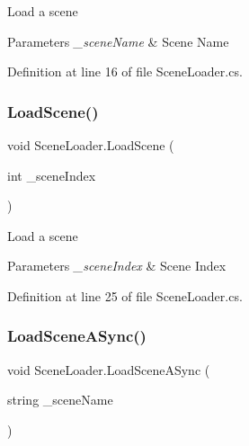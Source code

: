 Load a scene 


\begin{DoxyParams}{Parameters}
{\em \+\_\+scene\+Name} & Scene Name\\
\hline
\end{DoxyParams}


Definition at line 16 of file Scene\+Loader.\+cs.

\mbox{\label{class_scene_loader_a13020def59e988030b5a019fe31baaa3}} 
\subsubsection{\texorpdfstring{Load\+Scene()}{LoadScene()}\hspace{0.1cm}{\footnotesize\ttfamily [2/2]}}
{\footnotesize\ttfamily void Scene\+Loader.\+Load\+Scene (\begin{DoxyParamCaption}\item[{int}]{\+\_\+scene\+Index }\end{DoxyParamCaption})}



Load a scene 


\begin{DoxyParams}{Parameters}
{\em \+\_\+scene\+Index} & Scene Index\\
\hline
\end{DoxyParams}


Definition at line 25 of file Scene\+Loader.\+cs.

\mbox{\label{class_scene_loader_ae19ae9a4206c64852c9538d0671dbe96}} 
\subsubsection{\texorpdfstring{Load\+Scene\+A\+Sync()}{LoadSceneASync()}\hspace{0.1cm}{\footnotesize\ttfamily [1/2]}}
{\footnotesize\ttfamily void Scene\+Loader.\+Load\+Scene\+A\+Sync (\begin{DoxyParamCaption}\item[{string}]{\+\_\+scene\+Name }\end{DoxyParamCaption})}



